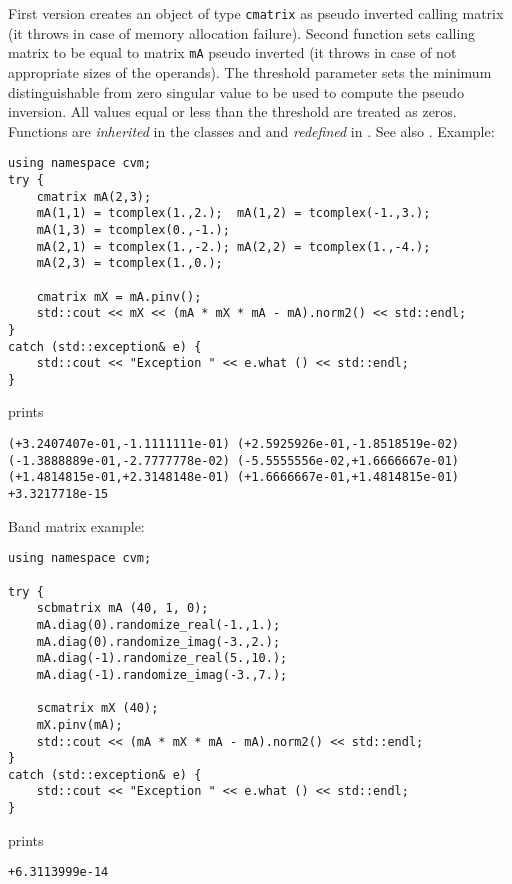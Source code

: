 First version creates an object of type \verb"cmatrix" as
 pseudo inverted calling matrix
(it throws 
in case of memory allocation failure).
Second function sets  calling matrix to be equal to  matrix
\verb"mA" pseudo inverted
(it throws 
in case of not appropriate sizes of the operands).
The threshold parameter sets  the minimum distinguishable
from zero singular value to be used to compute the pseudo inversion.
All values equal or less than the threshold are treated as zeros.
Functions are \emph{inherited} in the classes
 and 
and \emph{redefined} in .
See also .
Example:
\begin{Verbatim}
using namespace cvm;
try {
    cmatrix mA(2,3);
    mA(1,1) = tcomplex(1.,2.);  mA(1,2) = tcomplex(-1.,3.); 
    mA(1,3) = tcomplex(0.,-1.);
    mA(2,1) = tcomplex(1.,-2.); mA(2,2) = tcomplex(1.,-4.); 
    mA(2,3) = tcomplex(1.,0.);

    cmatrix mX = mA.pinv();
    std::cout << mX << (mA * mX * mA - mA).norm2() << std::endl;
}
catch (std::exception& e) {
    std::cout << "Exception " << e.what () << std::endl;
}
\end{Verbatim}
prints
\begin{Verbatim}
(+3.2407407e-01,-1.1111111e-01) (+2.5925926e-01,-1.8518519e-02)
(-1.3888889e-01,-2.7777778e-02) (-5.5555556e-02,+1.6666667e-01)
(+1.4814815e-01,+2.3148148e-01) (+1.6666667e-01,+1.4814815e-01)
+3.3217718e-15
\end{Verbatim}
Band matrix example:
\begin{Verbatim}
using namespace cvm;

try {
    scbmatrix mA (40, 1, 0);
    mA.diag(0).randomize_real(-1.,1.);
    mA.diag(0).randomize_imag(-3.,2.);
    mA.diag(-1).randomize_real(5.,10.);
    mA.diag(-1).randomize_imag(-3.,7.);

    scmatrix mX (40);
    mX.pinv(mA);
    std::cout << (mA * mX * mA - mA).norm2() << std::endl;
}
catch (std::exception& e) {
    std::cout << "Exception " << e.what () << std::endl;
}
\end{Verbatim}
prints
\begin{Verbatim}
+6.3113999e-14
\end{Verbatim}
\newpage




